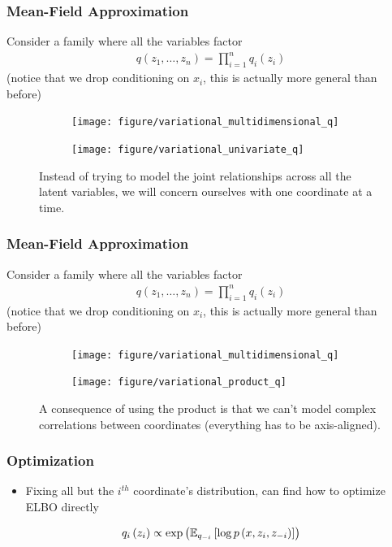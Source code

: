 \documentclass[10pt,mathserif]{beamer}
\begin{document}
\begin{frame}
  \frametitle{Mean-Field Approximation}
  Consider a family where all the variables factor
  \begin{align*}
    q\left(z_1, \dots, z_n\right) = \prod_{i = 1}^{n} q_{i}\left(z_i\right)
  \end{align*}
  (notice that we drop conditioning on $x_i$, this is actually more general than
  before)
\begin{figure}
  \begin{subfigure}{0.2\paperwidth}
    \texttt{[image: figure/variational\_multidimensional\_q]}
  \end{subfigure}
  \begin{subfigure}{0.2\paperwidth}
    \texttt{[image: figure/variational\_univariate\_q]}
  \end{subfigure}
  \caption{Instead of trying to model the joint relationships across all the
    latent variables, we will concern ourselves with one coordinate at a
    time. \label{fig:variational_multidimensional_q}}
\end{figure}
\end{frame}

\begin{frame}
  \frametitle{Mean-Field Approximation}
  Consider a family where all the variables factor
  \begin{align*}
    q\left(z_1, \dots, z_n\right) = \prod_{i = 1}^{n} q_{i}\left(z_i\right)
  \end{align*}
  (notice that we drop conditioning on $x_i$, this is actually more general than
  before)
  \begin{figure}[ht]
    \centering
    \begin{subfigure}{0.2\paperwidth}
      \texttt{[image: figure/variational\_multidimensional\_q]}
    \end{subfigure}
    \begin{subfigure}{0.2\paperwidth}
      \texttt{[image: figure/variational\_product\_q]}
    \end{subfigure}
    \caption{A consequence of using the product is that we can't model complex
      correlations between coordinates (everything has to be axis-aligned).
      \label{fig:variational_product_q}}
  \end{figure}
\end{frame}

\begin{frame}
  \frametitle{Optimization}
  \begin{itemize}
  \item Fixing all but the $i^{th}$ coordinate's distribution, can find how to
    optimize ELBO directly
  \end{itemize}
  \begin{align*}
q_i\left(z_i\right) \propto \operatorname{exp}\left(\mathbb{E}_{q_{-i}}\left[{\log p\left(x, z_i, z_{-i}\right)}\right]\right)
  \end{align*}
\end{frame}
\end{document}
